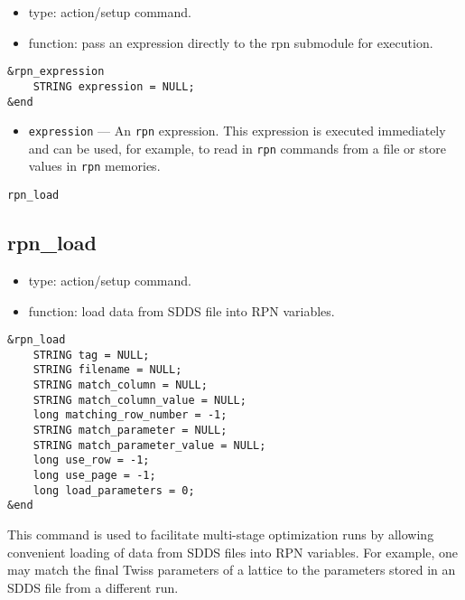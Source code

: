 \documentclass[11pt]{article}
\begin{document}
\begin{itemize}
\item type: action/setup command.
\item function: pass an expression directly to the rpn submodule for execution.
\end{itemize}

\begin{verbatim}
&rpn_expression
    STRING expression = NULL;
&end
\end{verbatim}

\begin{itemize}
\item \verb|expression| --- An {\tt rpn} expression.  This expression is executed immediately and can be
used, for example, to read in {\tt rpn} commands from a file or store values in {\tt rpn} memories.
\end{itemize}

\begin{latexonly}
\newpage
\begin{center}{\Large\verb|rpn_load|}\end{center}
\end{latexonly}
\subsection{rpn\_load \label{subsec:rpnload}}

\begin{itemize}
\item type: action/setup command.
\item function: load data from SDDS file into RPN variables.
\end{itemize}

\begin{verbatim}
&rpn_load
    STRING tag = NULL;
    STRING filename = NULL;
    STRING match_column = NULL;
    STRING match_column_value = NULL;
    long matching_row_number = -1;
    STRING match_parameter = NULL;
    STRING match_parameter_value = NULL;
    long use_row = -1;
    long use_page = -1;
    long load_parameters = 0;
&end
\end{verbatim}

This command is used to facilitate multi-stage optimization runs by allowing convenient
loading of data from SDDS files into RPN variables.  For example, one may match the
final Twiss parameters of a lattice to the parameters stored in an SDDS file from
a different run.
\end{document}
